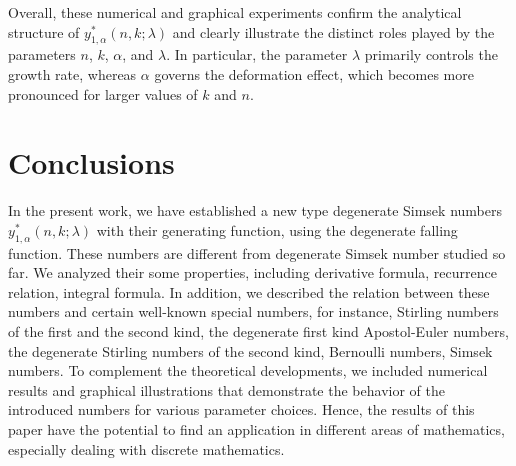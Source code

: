 \documentclass{amsart}
\numberwithin{equation}{section}
\theoremstyle{definition}
\theoremstyle{remark}
\begin{document}
Overall, these numerical and graphical experiments confirm the analytical structure of
$y_{1,\alpha}^{*}(n,k;\lambda)$ and clearly illustrate the distinct roles played
by the parameters $n$, $k$, $\alpha$, and $\lambda$.
In particular, the parameter $\lambda$ primarily controls the growth rate,
whereas $\alpha$ governs the deformation effect, which becomes more pronounced
for larger values of $k$ and $n$.

\section{Conclusions}
In the present work, we have established a new type degenerate Simsek numbers $y_{1,\alpha}^{*}(n,k;\lambda)$ with their generating function, using the degenerate falling function. These numbers are different from degenerate Simsek number studied so far. We analyzed their some properties, including derivative formula, recurrence relation, integral formula. In addition, we described the relation between these numbers and certain well-known special numbers, for instance, Stirling numbers of the first and the second kind, the degenerate first kind Apostol-Euler numbers, the degenerate Stirling numbers of the second kind, Bernoulli numbers, Simsek numbers. To complement the theoretical developments, we included numerical results and graphical illustrations that demonstrate the behavior of the introduced numbers for various parameter choices. Hence, the results of this paper have the potential to find an application in different areas of mathematics, especially dealing with discrete mathematics.
\end{document}
